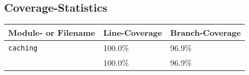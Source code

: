 

\subsection{Coverage-Statistics}
\begin{tabu} to \linewidth {lll}
\toprule
\textbf{Module- or Filename} & \textbf{Line-Coverage} & \textbf{Branch-Coverage}\\
\midrule
{\tt caching } & 100.0\% & 96.9\% \\
\hspace*{2ex}{\tt caching.\_""\_""init\_""\_"".py } & 100.0\% & 96.9\% \\
\bottomrule
\end{tabu}